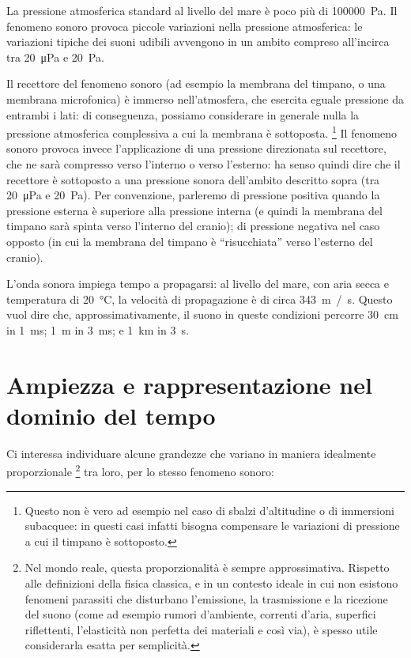 \documentclass[11pt]{report}
\begin{document}
La pressione atmosferica standard al livello del mare è poco più di \qty{100000}{Pa}. Il fenomeno sonoro provoca piccole variazioni nella pressione atmosferica: le variazioni tipiche dei suoni udibili avvengono in un ambito compreso all'incirca tra \qty{20}{\micro\pascal} e \qty{20}{\pascal}. 

Il recettore del fenomeno sonoro (ad esempio la membrana del timpano, o una membrana microfonica) è immerso nell'atmosfera, che esercita eguale pressione da entrambi i lati: di conseguenza, possiamo considerare in generale nulla la pressione atmosferica complessiva a cui la membrana è sottoposta.%
\footnote{Questo non è vero ad esempio nel caso di sbalzi d'altitudine o di immersioni subacquee: in questi casi infatti bisogna compensare le variazioni di pressione a cui il timpano è sottoposto.}
Il fenomeno sonoro provoca invece l'applicazione di una pressione direzionata sul recettore, che ne sarà compresso verso l'interno o verso l'esterno: ha senso quindi dire che il recettore è sottoposto a una pressione sonora dell'ambito descritto sopra (tra \qty{20}{\micro\pascal} e \qty{20}{\pascal}). Per convenzione, parleremo di pressione positiva quando la pressione esterna è superiore alla pressione interna (e quindi la membrana del timpano sarà spinta verso l'interno del cranio); di pressione negativa nel caso opposto (in cui la membrana del timpano è ``risucchiata'' verso l'esterno del cranio).

L'onda sonora impiega tempo a propagarsi: al livello del mare, con aria secca e temperatura di \qty{20}{\celsius}, la velocità di propagazione è di circa \qty{343}{m / s}. Questo vuol dire che, approssimativamente, il suono in queste condizioni percorre \qty{30}{cm} in \qty{1}{ms}; \qty{1}{m} in \qty{3}{ms}; e \qty{1}{km} in \qty{3}{s}.



\section{Ampiezza e rappresentazione nel dominio del tempo}

Ci interessa individuare alcune grandezze che variano in maniera idealmente proporzionale%
\footnote{Nel mondo reale, questa proporzionalità è sempre approssimativa. Rispetto alle definizioni della fisica classica, e in un contesto ideale in cui non esistono fenomeni parassiti che disturbano l'emissione, la trasmissione e la ricezione del suono (come ad esempio rumori d'ambiente, correnti d'aria, superfici riflettenti, l'elasticità non perfetta dei materiali e così via), è spesso utile considerarla esatta per semplicità.}
tra loro, per lo stesso fenomeno sonoro:
\end{document}
